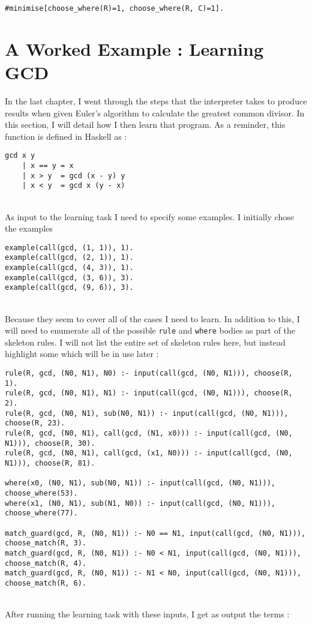 \begin{lstlisting}
#minimise[choose_where(R)=1, choose_where(R, C)=1].
\end{lstlisting}

\section{A Worked Example : Learning GCD}
In the last chapter, I went through the steps that the interpreter takes to produce results when given Euler's algorithm to calculate the greatest common divisor. In this section, I will detail how I then learn that program. As a reminder, this function is defined in Haskell as :

\begin{lstlisting}
gcd x y
	| x == y = x
	| x > y	 = gcd (x - y) y
	| x < y	 = gcd x (y - x)
\end{lstlisting}
\mbox{}\\
As input to the learning task I need to specify some examples. I initially chose the examples \\


\begin{lstlisting}
example(call(gcd, (1, 1)), 1).
example(call(gcd, (2, 1)), 1).
example(call(gcd, (4, 3)), 1).
example(call(gcd, (3, 6)), 3).
example(call(gcd, (9, 6)), 3).
\end{lstlisting}
\mbox{}\\
Because they seem to cover all of the cases I need to learn. In addition to this, I will need to enumerate all of the possible \lstinline{rule} and \lstinline{where} bodies as part of the skeleton rules. I will not list the entire set of skeleton rules here, but instead highlight some which will be in use later : \\

\begin{lstlisting}
rule(R, gcd, (N0, N1), N0) :- input(call(gcd, (N0, N1))), choose(R, 1).
rule(R, gcd, (N0, N1), N1) :- input(call(gcd, (N0, N1))), choose(R, 2).
rule(R, gcd, (N0, N1), sub(N0, N1)) :- input(call(gcd, (N0, N1))), choose(R, 23).
rule(R, gcd, (N0, N1), call(gcd, (N1, x0))) :- input(call(gcd, (N0, N1))), choose(R, 30).
rule(R, gcd, (N0, N1), call(gcd, (x1, N0))) :- input(call(gcd, (N0, N1))), choose(R, 81).

where(x0, (N0, N1), sub(N0, N1)) :- input(call(gcd, (N0, N1))), choose_where(53).
where(x1, (N0, N1), sub(N1, N0)) :- input(call(gcd, (N0, N1))), choose_where(77).

match_guard(gcd, R, (N0, N1)) :- N0 == N1, input(call(gcd, (N0, N1))), choose_match(R, 3).
match_guard(gcd, R, (N0, N1)) :- N0 < N1, input(call(gcd, (N0, N1))), choose_match(R, 4).
match_guard(gcd, R, (N0, N1)) :- N1 < N0, input(call(gcd, (N0, N1))), choose_match(R, 6).
\end{lstlisting}
\mbox{}\\
After running the learning task with these inputs, I get as output the terms : \\

